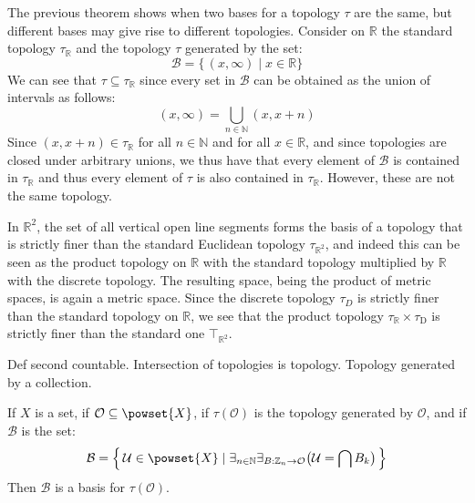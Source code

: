\documentclass{article}                                                        %
\begin{document}
        \begin{example}
            The previous theorem shows when two bases for a topology $\tau$ are
            the same, but different bases may give rise to different topologies.
            Consider on $\mathbb{R}$ the standard topology $\tau_{\mathbb{R}}$
            and the topology $\tau$ generated by the set:
            \begin{equation}
                \mathcal{B}=\{\,(x,\infty)\;|\;x\in\mathbb{R}\}
            \end{equation}
            We can see that $\tau\subseteq\tau_{\mathbb{R}}$ since every set
            in $\mathcal{B}$ can be obtained as the union of intervals as
            follows:
            \begin{equation}
                (x,\infty)=\bigcup_{n\in\mathbb{N}}(x,x+n)
            \end{equation}
            Since $(x,x+n)\in\tau_{\mathbb{R}}$ for all $n\in\mathbb{N}$ and for
            all $x\in\mathbb{R}$, and since topologies are closed under
            arbitrary unions, we thus have that every element of $\mathcal{B}$
            is contained in $\tau_{\mathbb{R}}$ and thus every element of
            $\tau$ is also contained in $\tau_{\mathbb{R}}$. However, these are
            not the same topology.
        \end{example}
        \begin{example}
            In $\mathbb{R}^{2}$, the set of all vertical open line segments
            forms the basis of a topology that is strictly finer than the
            standard Euclidean topology $\tau_{\mathbb{R}^{2}}$, and indeed this
            can be seen as the product topology on $\mathbb{R}$ with the
            standard topology multiplied by $\mathbb{R}$ with the discrete
            topology. The resulting space, being the product of metric spaces,
            is again a metric space. Since the discrete topology $\tau_{D}$ is
            strictly finer than the standard topology on $\mathbb{R}$, we see
            that the product topology $\tau_{\mathbb{R}}\times\tau_{\mathrm{D}}$
            is strictly finer than the standard one $\top_{\mathbb{R}^{2}}$.
        \end{example}
        Def second countable. Intersection of topologies is topology. Topology
        generated by a collection.
        \begin{theorem}
            If $X$ is a set, if $\mathcal{O}\subseteq\powset{X}$, if
            $\tau(\mathcal{O})$ is the topology generated by $\mathcal{O}$,
            and if $\mathcal{B}$ is the set:
            \begin{equation}
                \mathcal{B}=\Big\{\,\mathcal{U}\in\powset{X}\;|\;
                    \exists_{n\in\mathbb{N}}
                    \exists_{B:\mathbb{Z}_{n}\rightarrow\mathcal{O}}
                    \big(\mathcal{U}=\bigcap{B}_{k}\big)\,\Big\}
            \end{equation}
            Then $\mathcal{B}$ is a basis for $\tau(\mathcal{O})$.
        \end{theorem}
\end{document}
